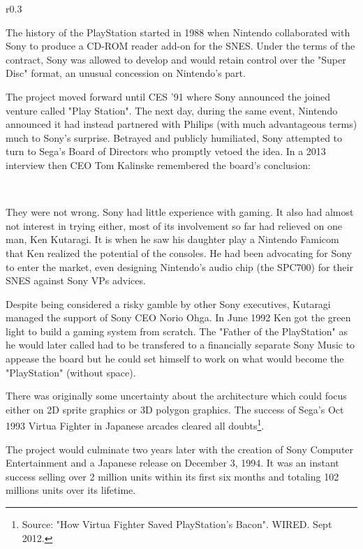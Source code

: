 \begin{wrapfigure}[11]{r}{0.3\textwidth}{
\centering {}}
\end{wrapfigure}
The history of the PlayStation started in 1988 when Nintendo collaborated with Sony to produce a CD-ROM reader add-on for the SNES. Under the terms of the contract, Sony was allowed to develop and would retain control over the "Super Disc" format, an unusual concession on Nintendo's part.\\
\par
 The project moved forward until CES '91 where Sony announced the joined venture called "Play Station". The next day, during the same event, Nintendo announced it had instead partnered with Philips (with much advantageous terms) much to Sony's surprise. Betrayed and publicly humiliated, Sony attempted to turn to Sega's Board of Directors who promptly vetoed the idea. In a 2013 interview then CEO Tom Kalinske remembered the board's conclusion:\\
\par
{}\\
\par
They were not wrong. Sony had little experience with gaming. It also had almost not interest in trying either, most of its involvement so far had relieved on one man, Ken Kutaragi. It is when he saw his daughter play a Nintendo Famicom that Ken realized the potential of the consoles. He had been advocating for Sony to enter the market, even designing Nintendo's audio chip (the SPC700) for their SNES against Sony VPs advices.\\
\par
 Despite being considered a risky gamble by other Sony executives, Kutaragi managed the support of Sony CEO Norio Ohga. In June 1992 Ken got the green light to build a gaming system from scratch. The "Father of the PlayStation" as he would later called had to be transfered to a financially separate Sony Music to appease the board but he could set himself to work on what would become the "PlayStation" (without space).\\
\par
There was originally some uncertainty about the architecture which could focus either on 2D sprite graphics or 3D polygon graphics. The success of Sega's Oct 1993 Virtua Fighter in Japanese arcades cleared all doubts\footnote{Source: "How Virtua Fighter Saved PlayStation's Bacon". WIRED. Sept 2012.}.\\
\par
The project would culminate two years later with the creation of Sony Computer Entertainment and a Japanese release on December 3, 1994. It was an instant success selling over 2 million units within its first six months and totaling 102 millions units over its lifetime.\\
\par
{}



